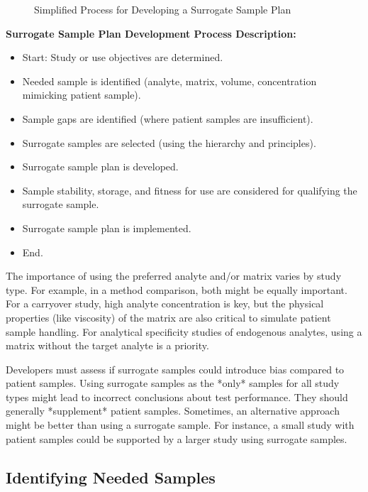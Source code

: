 \documentclass{article}
\begin{document}
\begin{figure}[h!]
    \centering
    \caption{Simplified Process for Developing a Surrogate Sample Plan \cite{CLSIEP39Ed1E}}
\end{figure}

\textbf{Surrogate Sample Plan Development Process Description:}
\begin{itemize}
    \item Start: Study or use objectives are determined.
    \item Needed sample is identified (analyte, matrix, volume, concentration mimicking patient sample).
    \item Sample gaps are identified (where patient samples are insufficient).
    \item Surrogate samples are selected (using the hierarchy and principles).
    \item Surrogate sample plan is developed.
    \item Sample stability, storage, and fitness for use are considered for qualifying the surrogate sample.
    \item Surrogate sample plan is implemented.
    \item End.
\end{itemize}

The importance of using the preferred analyte and/or matrix varies by study type. For example, in a method comparison, both might be equally important. For a carryover study, high analyte concentration is key, but the physical properties (like viscosity) of the matrix are also critical to simulate patient sample handling. For analytical specificity studies of endogenous analytes, using a matrix without the target analyte is a priority.

Developers must assess if surrogate samples could introduce bias compared to patient samples. Using surrogate samples as the *only* samples for all study types might lead to incorrect conclusions about test performance. They should generally *supplement* patient samples. Sometimes, an alternative approach might be better than using a surrogate sample. For instance, a small study with patient samples could be supported by a larger study using surrogate samples.

\subsection{Identifying Needed Samples}
\end{document}
